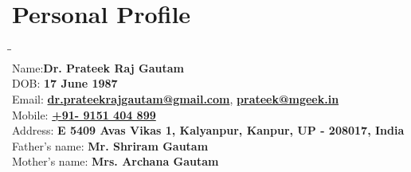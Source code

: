 \vspace{-2em}
\section{Personal Profile}
\vspace{-2.5em}
\begin{tabbing}
\=\hspace{7em}\= \kill \\
\>Name:\>\textbf{{Dr. Prateek Raj Gautam}} \\
\>DOB: \>\textbf{{17 June 1987}}\\ 
\>Email: \>\textbf{{\href{mailto:dr.prateekrajgautam@gmail.com}{dr.prateekrajgautam@gmail.com}}},  \textbf{{\href{mailto:prateek@mgeek.in}{prateek@mgeek.in}}} \\
\>Mobile: \>\textbf{{\href{https://t.me/prateekrajgautam}{+91- 9151 404 899}}}\\
\>Address: \>\textbf{{E 540\/9 Avas Vikas 1, Kalyanpur, Kanpur, UP - 208017, India}}\\
\>Father’s name: \>\textbf{{Mr. Shriram Gautam}} \\
\>Mother’s name: \>\textbf{{Mrs. Archana Gautam}}
\end{tabbing}
\vspace{-2em}
\sectionline